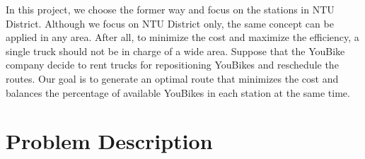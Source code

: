\documentclass[a4paper, 12pt]{article}%
\theoremstyle{definition}
\begin{document}
\noindent In this project, we choose the former way and focus on the stations in NTU District. Although we focus on NTU District only, the same concept can be applied in any area. After all, to minimize the cost and maximize the efficiency, a single truck should not be in charge of a wide area. Suppose that the YouBike company decide to rent trucks for repositioning YouBikes and reschedule the routes. Our goal is to generate an optimal route that minimizes the cost and balances the percentage of available YouBikes in each station at the same time.







\section{Problem Description}
\end{document}
